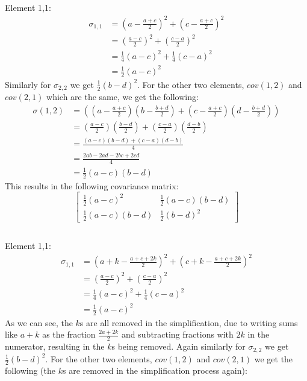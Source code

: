 \documentclass[10pt]{article}
\begin{document}
\subsection{}
Element 1,1:
\begin{align}
\sigma_{1,1} & = (a-\frac{a+c}{2})^2+(c-\frac{a+c}{2})^2 \\
& = (\frac{a-c}{2})^2 + (\frac{c-a}{2})^2 \\
& = \frac{1}{4}(a-c)^2 + \frac{1}{4}(c-a)^2 \\
& = \frac{1}{2}(a-c)^2
\end{align}
Similarly for $\sigma_{2,2}$ we get $\frac{1}{2}(b-d)^2$.
For the other two elements, $cov(1,2)$ and $cov(2,1)$ which are the same, we get the following:
\begin{align}
\sigma(1,2) & = ((a-\frac{a+c}{2})(b-\frac{b+d}{2})+(c-\frac{a+c}{2})(d-\frac{b+d}{2})) \\
& = (\frac{a-c}{2}) (\frac{b-d}{2}) + (\frac{c-a}{2}) (\frac{d-b}{2}) \\
& = \frac{(a-c)(b-d) + (c-a)(d-b)}{4} \\
& = \frac{2ab - 2ad - 2bc + 2cd}{4} \\
& = \frac{1}{2} (a-c)(b-d)
\end{align}
This results in the following covariance matrix:
\begin{equation}
    \begin{bmatrix}
      \frac{1}{2}(a-c)^2 & \frac{1}{2} (a-c)(b-d)\\
      \frac{1}{2} (a-c)(b-d) & \frac{1}{2}(b-d)^2
    \end{bmatrix}
\end{equation}

\subsection{}
Element 1,1:
\begin{align}
\sigma_{1,1} & = (a+k-\frac{a+c+2k}{2})^2+(c+k-\frac{a+c+2k}{2})^2 \\
& = (\frac{a-c}{2})^2 + (\frac{c-a}{2})^2 \\
& = \frac{1}{4}(a-c)^2 + \frac{1}{4}(c-a)^2 \\
& = \frac{1}{2}(a-c)^2
\end{align}
As we can see, the $k$s are all removed in the simplification, due to writing sums like $a+k$ as the fraction $\frac{2a+2k}{2}$ and subtracting fractions with $2k$ in the numerator, resulting in the $k$s being removed.
Again similarly for $\sigma_{2,2}$ we get $\frac{1}{2}(b-d)^2$.
For the other two elements, $cov(1,2)$ and $cov(2,1)$ we get the following (the $k$s are removed in the simplification process again):
\end{document}
